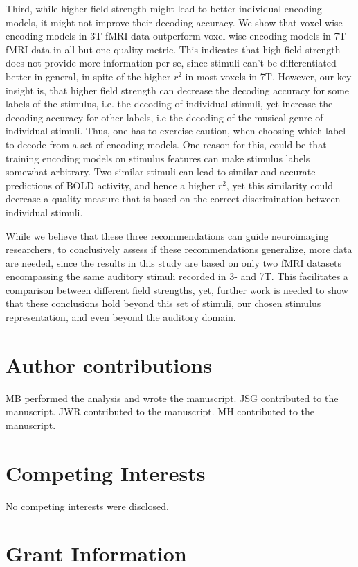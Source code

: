 Third, while higher field strength might lead to better individual encoding models, it might not improve their decoding accuracy. We show that voxel-wise encoding models in 3T f{MRI} data outperform voxel-wise encoding models in 7T f{MRI} data in all but one quality metric. This indicates that high field strength does not provide more information per se, since stimuli can't be differentiated better in general, in spite of the higher $r^{2}$ in most voxels in 7T. However, our key insight is, that higher field strength can decrease the decoding accuracy for some labels of the stimulus, i.e. the decoding of individual stimuli, yet increase the decoding accuracy for other labels, i.e the decoding of the musical genre of individual stimuli. Thus, one has to exercise caution, when choosing which label to decode from a set of encoding models. One reason for this, could be that training encoding models on stimulus features can make stimulus labels somewhat arbitrary. Two similar stimuli can lead to similar and accurate predictions of BOLD activity, and hence a higher $r^{2}$,  yet this similarity could decrease a quality measure that is based on the correct discrimination between individual stimuli.

While we believe that these three recommendations can guide neuroimaging researchers, to conclusively assess if these recommendations generalize, more data are needed, since the results in this study are based on only two f{MRI} datasets encompassing the same auditory stimuli recorded in 3- and 7T. This facilitates a comparison between different field strengths, yet, further work is needed to show that these conclusions hold beyond this set of stimuli, our chosen stimulus representation, and even beyond the auditory domain.

\section*{Author contributions}

MB performed the analysis and wrote the manuscript.
JSG contributed to the manuscript.
JWR contributed to the manuscript.
MH contributed to the manuscript.

\section*{Competing Interests}

No competing interests were disclosed.

\section*{Grant Information}

